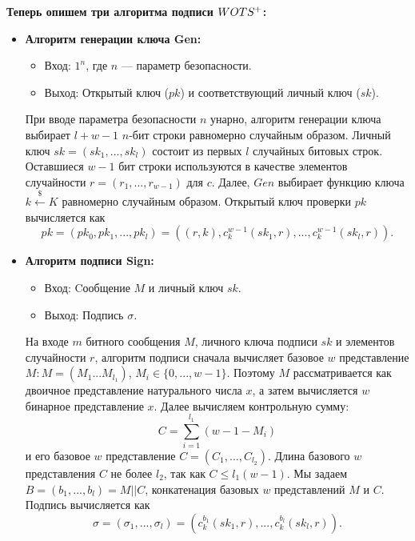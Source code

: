 \documentclass[a4paper, 14pt]{extarticle}
\begin{document}
\textbf{Теперь опишем три алгоритма подписи $W\-OTS^{+}$:}

\begin{itemize}
    \item \textbf{Алгоритм генерации ключа Gen:}

    \begin{itemize}
        \item Вход: $1^{n}$, где $n$ --- параметр безопасности.
        \item Выход: Открытый ключ ($pk$) и соответствующий личный ключ ($sk$).
    \end{itemize}

    При вводе параметра безопасности $n$ унарно, алгоритм генерации ключа выбирает $l + w - 1$ $n$-бит строки равномерно случайным образом. Личный ключ $sk = (sk_{1}, ..., sk_{l})$ состоит из первых $l$ случайных битовых строк. Оставшиеся $w - 1$ бит строки используются в качестве элементов случайности $r = (r_{1}, ..., r_{w - 1})$ для $c$. Далее, $Gen$ выбирает функцию ключа $k \stackrel{\$}\leftarrow K$ равномерно случайным образом. Открытый ключ проверки $pk$ вычисляется как
    \[ pk = (pk_{0}, pk_{1}, ..., pk_{l}) = ((r, k),c^{w - 1}_{k}(sk_{1},r), ..., c^{w - 1}_{k}(sk_{l}, r)). \]

    \item \textbf{Алгоритм подписи Sign:}

    \begin{itemize}
        \item Вход: Cообщение $M$ и личный ключ $sk$.
        \item Выход: Подпись $\sigma$.
    \end{itemize}

    На входе $m$ битного сообщения $M$, личного ключа подписи $sk$ и элементов случайности $r$, алгоритм подписи сначала вычисляет базовое $w$ представление $M: M = (M_{1} . . . M_{l_{1}} )$, $M_{i} \in \{0, ..., w - 1\}$. Поэтому $M$ рассматривается как двоичное представление натурального числа $x$, а затем вычисляется $w$ бинарное представление $x$. Далее вычисляем контрольную сумму:
    \[ C = \sum^{l_{1}}_{i = 1}(w - 1 - M_{i}) \]
    и его базовое $w$ представление $C = (C_{1}, ..., C_{l_{2}})$. Длина базового $w$ представления $C$ не более $l_{2}$, так как $C \leq l_{1}(w - 1)$. Мы задаем $B = (b_{1}, ..., b_{l}) = M || C$, конкатенация базовых $w$ представлений $M$ и $C$. Подпись вычисляется как
    \[ \sigma = (\sigma_{1}, ..., \sigma_{l}) = (c^{b_{1}}_{k}(sk_{1},r), ..., c^{b_{l}}_{k}(sk_{l},r)). \]


\end{itemize}
\end{document}
